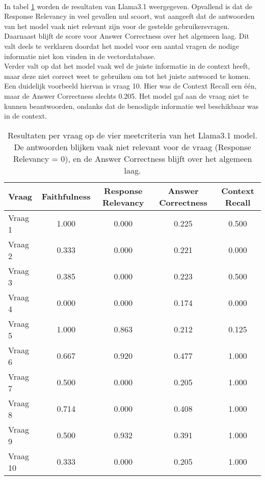 \\[1em]
In tabel \ref{tab:resultaten_vragen_llama3.1} worden de resultaten van Llama3.1 weergegeven. Opvallend is dat de Response Relevancy in veel gevallen nul scoort, wat aangeeft dat de antwoorden van het model vaak niet relevant zijn voor de gestelde gebruikersvragen. Daarnaast blijft de score voor Answer Correctness over het algemeen laag. Dit valt deels te verklaren doordat het model voor een aantal vragen de nodige informatie niet kon vinden in de vectordatabase.
\\[1em]
Verder valt op dat het model vaak wel de juiste informatie in de context heeft, maar deze niet correct weet te gebruiken om tot het juiste antwoord te komen. Een duidelijk voorbeeld hiervan is vraag 10. Hier was de Context Recall een één, maar de Answer Correctness slechts 0.205. Het model gaf aan de vraag niet te kunnen beantwoorden, ondanks dat de benodigde informatie wel beschikbaar was in de context.

\begin{table}[H]
    \begin{tabular}{|l|c|c|c|c|}
        \hline
        \textbf{Vraag} & \textbf{Faithfulness} & \textbf{Response Relevancy} & \textbf{Answer Correctness} & \textbf{Context Recall} \\
        \hline
        Vraag 1 & 1.000 & 0.000 & 0.225 & 0.500 \\
        Vraag 2 & 0.333 & 0.000 & 0.221 & 0.000 \\
        Vraag 3 & 0.385 & 0.000 & 0.223 & 0.500 \\
        Vraag 4 & 0.000 & 0.000 & 0.174 & 0.000 \\
        Vraag 5 & 1.000 & 0.863 & 0.212 & 0.125 \\
        Vraag 6 & 0.667 & 0.920 & 0.477 & 1.000 \\
        Vraag 7 & 0.500 & 0.000 & 0.205 & 1.000 \\
        Vraag 8 & 0.714 & 0.000 & 0.408 & 1.000 \\
        Vraag 9 & 0.500 & 0.932 & 0.391 & 1.000 \\
        Vraag 10 & 0.333 & 0.000 & 0.205 & 1.000 \\
        \hline
    \end{tabular}
    \caption{Resultaten per vraag op de vier meetcriteria van het Llama3.1 model. De antwoorden blijken vaak niet relevant voor de vraag (Response Relevancy = 0), en de Answer Correctness blijft over het algemeen laag.}
    \label{tab:resultaten_vragen_llama3.1}
\end{table}

